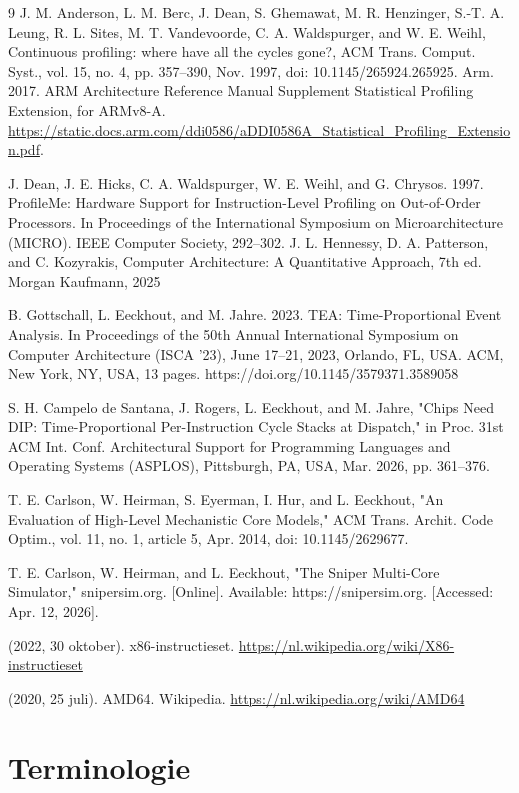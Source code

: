 \documentclass[12pt,a4paper,faculty=ea,language=nl]{ugent-doc}
\begin{document}
\renewcommand{\refname}{Referenties}
\begin{thebibliography}{9}
    J. M. Anderson, L. M. Berc, J. Dean, S. Ghemawat, M. R. Henzinger, S.-T. A. Leung, R. L. Sites, M. T. Vandevoorde, C. A. Waldspurger, and W. E. Weihl, Continuous profiling: where have all the cycles gone?, ACM Trans. Comput. Syst., vol. 15, no. 4, pp. 357--390, Nov. 1997, doi: 10.1145/265924.265925.
    Arm. 2017. ARM Architecture Reference Manual Supplement Statistical
    Profiling Extension, for ARMv8-A. \url{https://static.docs.arm.com/ddi0586/aDDI0586A_Statistical_Profiling_Extension.pdf}.

    J. Dean, J. E. Hicks, C. A. Waldspurger, W. E. Weihl, and G.
    Chrysos. 1997. ProfileMe: Hardware Support for Instruction-Level Profiling
    on Out-of-Order Processors. In Proceedings of the International Symposium on
    Microarchitecture (MICRO). IEEE Computer Society, 292–302.
    J. L. Hennessy, D. A. Patterson, and C. Kozyrakis, Computer Architecture: A Quantitative Approach, 7th ed. Morgan Kaufmann, 2025

    B. Gottschall, L. Eeckhout, and M. Jahre. 2023. TEA: Time-Proportional Event Analysis. In Proceedings of the 50th Annual International Symposium on Computer Architecture (ISCA ’23), June 17–21, 2023, Orlando, FL, USA. ACM, New York, NY, USA, 13 pages. https://doi.org/10.1145/3579371.3589058

    S. H. Campelo de Santana, J. Rogers, L. Eeckhout, and M. Jahre, "Chips Need DIP: Time-Proportional Per-Instruction Cycle Stacks at Dispatch," in Proc. 31st ACM Int. Conf. Architectural Support for Programming Languages and Operating Systems (ASPLOS), Pittsburgh, PA, USA, Mar. 2026, pp. 361–376.

    T. E. Carlson, W. Heirman, S. Eyerman, I. Hur, and L. Eeckhout, "An Evaluation of High-Level Mechanistic Core Models," ACM Trans. Archit. Code Optim., vol. 11, no. 1, article 5, Apr. 2014, doi: 10.1145/2629677.

    T. E. Carlson, W. Heirman, and L. Eeckhout, "The Sniper Multi-Core Simulator," snipersim.org. [Online]. Available: https://snipersim.org. [Accessed: Apr. 12, 2026].

    (2022, 30 oktober). x86-instructieset. \newline
    \url{https://nl.wikipedia.org/wiki/X86-instructieset}

    (2020, 25 juli). AMD64. Wikipedia. \newline
    \url{https://nl.wikipedia.org/wiki/AMD64}
\end{thebibliography}

\appendix
\section{Terminologie}
\end{document}
